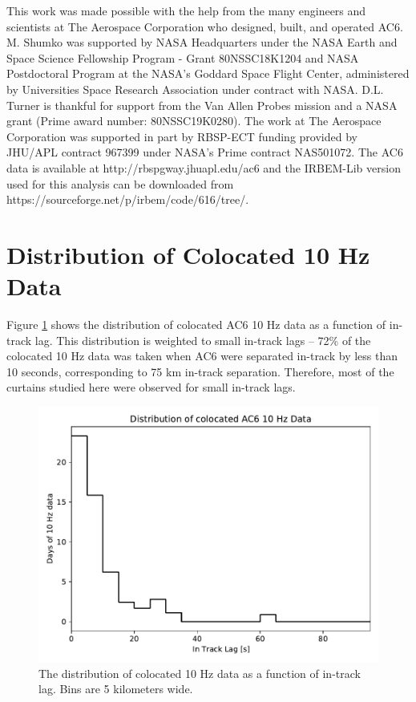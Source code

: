 \documentclass[draft]{agujournal2019}
\begin{document}

\acknowledgments
This work was made possible with the help from the many engineers and scientists at The Aerospace Corporation who designed, built, and operated AC6. M. Shumko was supported by NASA Headquarters under the NASA Earth and Space Science Fellowship Program - Grant 80NSSC18K1204 and NASA Postdoctoral Program at the NASA's Goddard Space Flight Center, administered by Universities Space Research Association under contract with NASA. D.L. Turner is thankful for support from the Van Allen Probes mission and a NASA grant (Prime award number: 80NSSC19K0280). The work at The Aerospace Corporation was supported in part by RBSP-ECT funding provided by JHU/APL contract 967399 under NASA's Prime contract NAS501072. The AC6 data is available at http://rbspgway.jhuapl.edu/ac6 and the IRBEM-Lib version used for this analysis can be downloaded from https://sourceforge.net/p/irbem/code/616/tree/.

\appendix

\section{Distribution of Colocated 10 Hz Data}
Figure \ref{a_10Hz_dist} shows the distribution of colocated AC6 10 Hz data as a function of in-track lag. This distribution is weighted to small in-track lags -- 72\% of the colocated 10 Hz data was taken when AC6 were separated in-track by less than 10 seconds, corresponding to 75 km in-track separation. Therefore, most of the curtains studied here were observed for small in-track lags.

\begin{figure}
\includegraphics[width=\textwidth]{a_10hz_dist.pdf}
\caption{The distribution of colocated 10 Hz data as a function of in-track lag. Bins are 5 kilometers wide.}
\label{a_10Hz_dist}
\end{figure}


%
\end{document}
